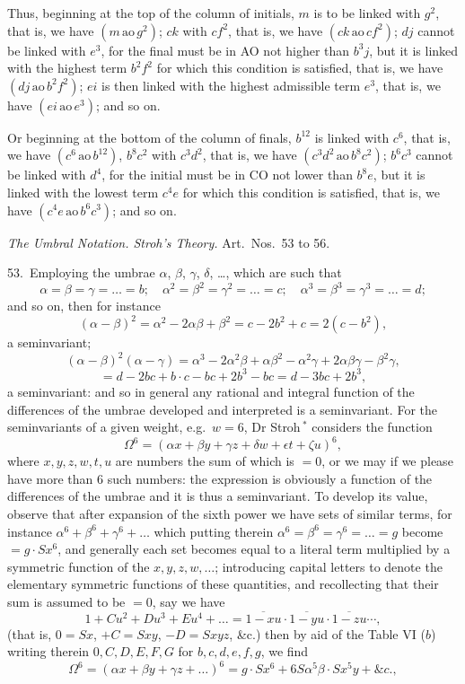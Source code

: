 \documentclass[11pt]{article}
\begin{document}
Thus, beginning at the top of the column of initials, $m$ is to be linked with $g^2$, that is, we have $(m\,\mathrm{ao}\,g^2)$; $ck$ with $cf^2$, that is, we have $(ck\,\mathrm{ao}\,cf^2)$; $dj$ cannot be linked with $e^3$, for the final must be in AO not higher than $b^3 j$, but it is linked with the highest term $b^2 f^2$ for which this condition is satisfied, that is, we have $(dj\,\mathrm{ao}\,b^2 f^2)$; $ei$ is then linked with the highest admissible term $e^3$, that is, we have $(ei\,\mathrm{ao}\,e^3)$; and so on.

Or beginning at the bottom of the column of finals, $b^{12}$ is linked with $c^6$, that is, we have $(c^6\,\mathrm{ao}\,b^{12})$, $b^8 c^2$ with $c^3 d^2$, that is, we have $(c^3 d^2\,\mathrm{ao}\,b^8 c^2)$; $b^6 c^3$ cannot be linked with $d^4$, for the initial must be in CO not lower than $b^8 e$, but it is linked with the lowest term $c^4 e$ for which this condition is satisfied, that is, we have $(c^4 e\,\mathrm{ao}\,b^6 c^3)$; and so on.

\begin{center}
\textit{The Umbral Notation. Stroh's Theory.} Art.\ Nos.\ 53 to 56.
\end{center}

53.\ Employing the umbrae $\alpha$, $\beta$, $\gamma$, $\delta$, \ldots, which are such that
\[
\alpha = \beta = \gamma = \ldots = b;\quad \alpha^2 = \beta^2 = \gamma^2 = \ldots = c;\quad \alpha^3 = \beta^3 = \gamma^3 = \ldots = d;
\]
and so on, then for instance
\[
(\alpha - \beta)^2 = \alpha^2 - 2\alpha\beta + \beta^2 = c - 2b^2 + c = 2(c - b^2),
\]
a seminvariant;
\[
(\alpha - \beta)^2(\alpha - \gamma) = \alpha^3 - 2\alpha^2\beta + \alpha\beta^2 - \alpha^2\gamma + 2\alpha\beta\gamma - \beta^2\gamma,
\]
\[
= d - 2bc + b\cdot c - bc + 2b^3 - bc = d - 3bc + 2b^3,
\]
a seminvariant: and so in general any rational and integral function of the differences of the umbrae developed and interpreted is a seminvariant. For the seminvariants of a given weight, e.g.\ $w = 6$, Dr Stroh\,$^*$ considers the function
\[
\Omega^6 = (\alpha x + \beta y + \gamma z + \delta w + \epsilon t + \zeta u)^6,
\]
where $x, y, z, w, t, u$ are numbers the sum of which is $= 0$, or we may if we please have more than 6 such numbers: the expression is obviously a function of the differences of the umbrae and it is thus a seminvariant. To develop its value, observe that after expansion of the sixth power we have sets of similar terms, for instance $\alpha^6 + \beta^6 + \gamma^6 + \ldots$ which putting therein $\alpha^6 = \beta^6 = \gamma^6 = \ldots = g$ become $= g\cdot S x^6$, and generally each set becomes equal to a literal term multiplied by a symmetric function of the $x, y, z, w, \ldots$; introducing capital letters to denote the elementary symmetric functions of these quantities, and recollecting that their sum is assumed to be $= 0$, say we have
\[
1 + C u^2 + D u^3 + E u^4 + \ldots = \overline{1 - xu}\cdot\overline{1 - yu}\cdot\overline{1 - zu}\cdots,
\]
(that is, $0 = S x$, $+C = S xy$, $-D = S xyz$, \&c.) then by aid of the Table VI ($b$) writing therein $0, C, D, E, F, G$ for $b, c, d, e, f, g$, we find
\[
\Omega^6 = (\alpha x + \beta y + \gamma z + \ldots)^6 = g\cdot S x^6 + 6 S\alpha^5\beta\cdot S x^5 y + \&c.,
\]
\end{document}

